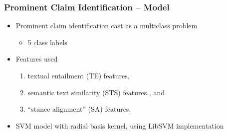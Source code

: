 \documentclass{beamer}
\begin{document}
\begin{frame}
	\frametitle{Prominent Claim Identification -- Model}

\begin{itemize}
	\item Prominent claim identification cast as a multiclass problem
	\begin{itemize}
		\item 5 class labels
	\end{itemize}
\item Features used
	\begin{enumerate}
	\item textual entailment (TE) features, 
	\item semantic text similarity (STS) features \cite{vsaric2012takelab}, and
	\item ``stance alignment'' (SA) features. 
	\end{enumerate}
\item SVM model with radial basis kernel, using LibSVM implementation \cite{chang2011libsvm}
\end{itemize}
\end{frame}
\end{document}
